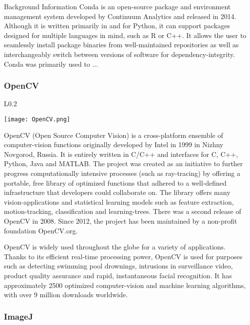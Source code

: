 \documentclass[a4paper,12pt]{article}
\begin{document}
\begin{section}{Background Information}
Conda is an open-source package and environment management system developed by Continuum Analytics and released in 2014. Although it is written primarily in and for Python, it can support packages designed for multiple languages in mind, such as R or C++. It allows the user to seamlessly install package binaries from well-maintained repositories as well as interchangeably switch between versions of software for dependency-integrity. Conda was primarily used to ...


\subsubsection{OpenCV}

\begin{wrapfigure}{L}{0.2\textwidth}
\begin{center}
\centering
\texttt{[image: OpenCV.png]}
\end{center}
\end{wrapfigure}


OpenCV (Open Source Computer Vision) is a cross-platform ensemble of computer-vision functions originally developed by Intel in 1999 in Nizhny Novgorod, Russia. It is entirely written in C/C++ and interfaces for C, C++, Python, Java and MATLAB. The project was created as an initiative to further progress computationally intensive processes (such as ray-tracing) by offering a portable, free library of optimized functions that adhered to a well-defined infrastructure that developers could collaborate on. The library offers many vision-applications and statistical learning models such as feature extraction, motion-tracking, classification and learning-trees. There was a second release of OpenCV in 2008. Since 2012, the project has been maintained by a non-profit foundation OpenCV.org. 

OpenCV is widely used throughout the globe for a variety of applications. Thanks to its efficient real-time processing power, OpenCV is used for purposes such as detecting swimming pool drownings, intrusions in surveillance video, product quality assurance and rapid, instantaneous facial recognition. It has approximately 2500 optimized computer-vision and machine learning algorithms, with over 9 million downloads worldwide. 

\subsubsection{ImageJ}


\end{section}
\end{document}
